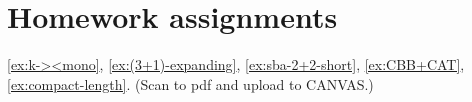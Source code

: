 \chapter*{Homework assignments}

\ref{ex:k-><mono},
\ref{ex:(3+1)-expanding},
\ref{ex:sba-2+2-short},
\ref{ex:CBB+CAT},
\ref{ex:compact-length}.
(Scan to pdf and upload to CANVAS.)

